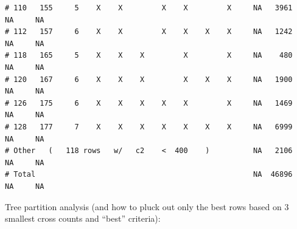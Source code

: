 \documentclass{article}\usepackage[]{graphicx}\usepackage[]{color}
\makeatletter
\newenvironment{kframe}{%
 \def\at@end@of@kframe{}%
 \ifinner\ifhmode%
  \def\at@end@of@kframe{\end{minipage}}%
  \begin{minipage}{\columnwidth}%
 \fi\fi%
 \def\FrameCommand##1{\hskip\@totalleftmargin \hskip-\fboxsep
 \colorbox{shadecolor}{##1}\hskip-\fboxsep
     \hskip-\linewidth \hskip-\@totalleftmargin \hskip\columnwidth}%
 \MakeFramed {\advance\hsize-\width
   \@totalleftmargin\z@ \linewidth\hsize
   \@setminipage}}%
 {\par\unskip\endMakeFramed%
 \at@end@of@kframe}
\newenvironment{knitrout}{}{} %
\makeatother
\begin{document}
\begin{knitrout}
\begin{kframe}
\begin{verbatim}
# 110   155     5    X    X         X    X         X     NA   3961     NA     NA
# 112   157     6    X    X         X    X    X    X     NA   1242     NA     NA
# 118   165     5    X    X    X         X         X     NA    480     NA     NA
# 120   167     6    X    X    X         X    X    X     NA   1900     NA     NA
# 126   175     6    X    X    X    X    X         X     NA   1469     NA     NA
# 128   177     7    X    X    X    X    X    X    X     NA   6999     NA     NA
# Other   (   118 rows   w/   c2    <  400    )          NA   2106     NA     NA
# Total                                                  NA  46896     NA     NA
\end{verbatim}
\end{kframe}
\end{knitrout}

Tree partition analysis (and how to pluck out only the best rows based on 3 smallest cross counts and ``best'' criteria):
\end{document}
